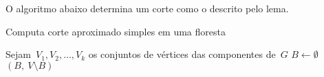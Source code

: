 \bigskip


O algoritmo abaixo determina um corte como o descrito pelo lema.

\medskip
\medskip

\begin{algorithm}[H]
\label{alg:simpleApproxCutForest}

	\caption{Computa corte aproximado simples em uma floresta}
	Sejam~$V_1, V_2,\ldots, V_k$ os conjuntos de vértices das
	componentes de~$G$\;
	$B \gets \emptyset$\;
	\Return $(B,\ V\setminus B)$\;

\end{algorithm}	

\bigskip



